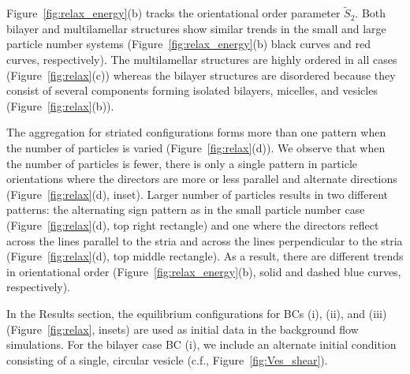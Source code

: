 \documentclass[prb,preprint,showpacs,preprintnumbers,amsmath,amssymb,longbibliography]{revtex4-1}
\begin{document}
Figure~\ref{fig:relax_energy}(b) tracks the orientational order
parameter $\tilde{S}_2$. Both bilayer and multilamellar structures show
similar trends in the small and large particle number systems
(Figure~\ref{fig:relax_energy}(b) black curves and red curves,
respectively). The multilamellar structures are highly ordered in all
cases (Figure~\ref{fig:relax}(c)) whereas the bilayer structures are
disordered because they consist of several components forming isolated
bilayers, micelles, and vesicles (Figure~\ref{fig:relax}(b)).

The aggregation for striated configurations forms more than one pattern
when the number of particles is varied (Figure~\ref{fig:relax}(d)). We
observe that when the number of particles is fewer, there is only a
single pattern in particle orientations where the directors are more or
less parallel and alternate directions (Figure~\ref{fig:relax}(d),
inset). Larger number of particles results in two different patterns:
the alternating sign pattern as in the small particle number case
(Figure~\ref{fig:relax}(d), top right rectangle) and one where the
directors reflect across the lines parallel to the stria and across the
lines perpendicular to the stria (Figure~\ref{fig:relax}(d), top middle
rectangle). As a result, there are different trends in orientational
order (Figure~\ref{fig:relax_energy}(b), solid and dashed blue curves,
respectively).

In the Results section, the equilibrium configurations for BCs (i),
(ii), and (iii) (Figure~\ref{fig:relax}, insets) are used as initial
data in the background flow simulations. For the bilayer case BC (i),
we include an alternate initial condition consisting of a single,
circular vesicle (c.f., Figure~\ref{fig:Ves_shear}).


\end{document}
